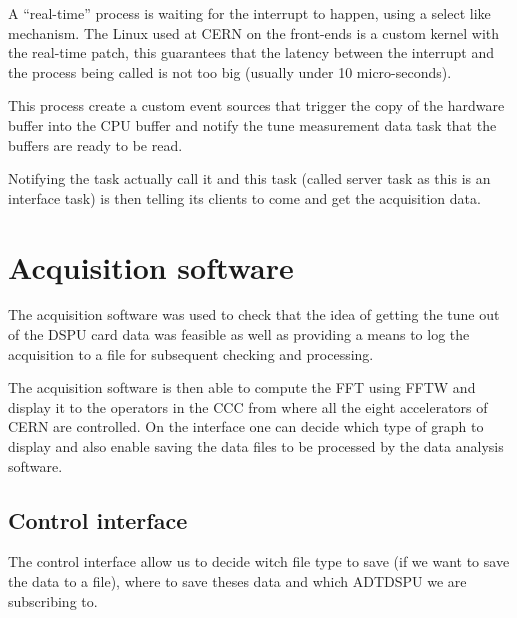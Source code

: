 A ``real-time'' process is waiting for the interrupt to happen, using a select like mechanism. The Linux used at \gls{CERN} on the front-ends is a custom kernel with the real-time patch, this guarantees that the latency between the interrupt and the process being called is not too big (usually under 10 micro-seconds).

This process create a custom event sources that trigger the copy of the hardware buffer into the \gls{CPU} buffer and notify the tune measurement data task that the buffers are ready to be read.

Notifying the task actually call it and this task (called server task as this is an interface task) is then telling its clients to come and get the acquisition data. 

\section{Acquisition software}

The acquisition software was used to check that the idea of getting the tune out of the DSPU card data was feasible as well as providing a means to log the acquisition to a file for subsequent checking and processing.

The acquisition software is then able to compute the \gls{FFT} using \gls{FFTW} and display it to the operators in the \gls{CCC} from where all the eight accelerators of \gls{CERN} are controlled. On the interface one can decide which type of graph to display and also enable saving the data files to be processed by the data analysis software.

\subsection{Control interface}

The control interface allow us to decide witch file type to save (if we want to save the data to a file), where to save theses data and which ADTDSPU we are subscribing to.

